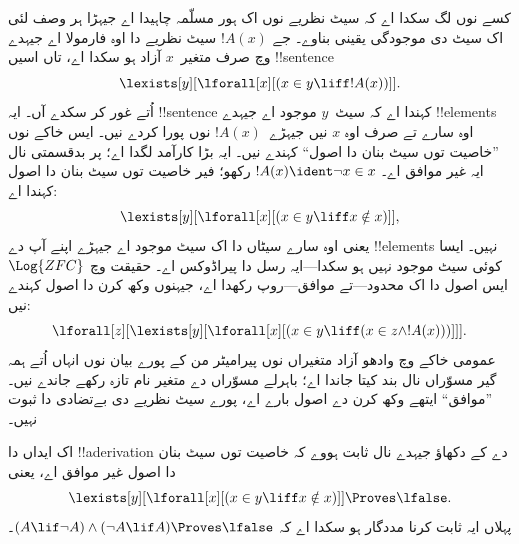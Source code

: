 \documentclass[../../../include/open-logic-section]{subfiles}
\begin{document}
کسے نوں لگ سکدا اے کہ سیٹ نظریے نوں اک ہور مسلّمہ چاہیدا
اے جیہڑا ہر وصف لئی اک سیٹ دی موجودگی یقینی بناوے۔
جے $!A(x)$ سیٹ نظریے دا اوہ فارمولا اے جیہدے وچ
صرف متغیر~$x$ آزاد ہو سکدا اے، تاں اسیں !!{sentence}
\[
\lexists[y][\lforall[x][(x \in y \liff !A(x))]].
\]
اُتے غور کر سکدے آں۔ ایہ !!{sentence} کہندا اے کہ
سیٹ~$y$ موجود اے جیہدے !!{element}s اوہ سارے تے
صرف اوہ $x$ نیں جیہڑے~$!A(x)$ نوں پورا کردے نیں۔
ایس خاکے نوں ”خاصیت توں سیٹ بنان دا اصول“ کہندے نیں۔
ایہ بڑا کارآمد لگدا اے؛ پر بدقسمتی نال ایہ غیر موافق اے۔
$!A(x) \ident \lnot x \in x$ رکھو؛ فیر خاصیت توں
سیٹ بنان دا اصول کہندا اے:
\[
\lexists[y][\lforall[x][(x \in y \liff x \notin x)]],
\]
یعنی اوہ سارے سیٹاں دا اک سیٹ موجود اے جیہڑے
اپنے آپ دے !!{element}s نہیں۔ ایسا کوئی سیٹ موجود
نہیں ہو سکدا---ایہ رسل دا پیراڈوکس اے۔ حقیقت وچ
$\Log{ZFC}$ ایس اصول دا اک محدود---تے موافق---روپ
رکھدا اے، جیہنوں وکھ کرن دا اصول کہندے نیں:
\[
\lforall[z][\lexists[y][\lforall[x][(x \in y \liff (x \in z \land
      !A(x)))]]].
\]
عمومی خاکے وچ وادھو آزاد متغیراں نوں پیرامیٹر من کے پورے
بیان نوں انہاں اُتے ہمہ گیر مسوّراں نال بند کیتا جاندا اے؛
باہرلے مسوّراں دے متغیر نام تازہ رکھے جاندے نیں۔ ”موافق“
ایتھے وکھ کرن دے اصول بارے اے، پورے سیٹ نظریے دی بےتضادی
دا ثبوت نہیں۔

\begin{prob}
اک ایداں دا !!a{derivation} دے کے دکھاؤ جیہدے نال ثابت ہووے
کہ خاصیت توں سیٹ بنان دا اصول غیر موافق اے، یعنی
\[
\lexists[y][\lforall[x][(x \in y \liff x \notin x)]] \Proves \lfalse.
\]
پہلاں ایہ ثابت کرنا مددگار ہو سکدا اے کہ
$(A \lif \lnot A) \land (\lnot A \lif A)
\Proves \lfalse$۔
\end{prob}
\end{document}
